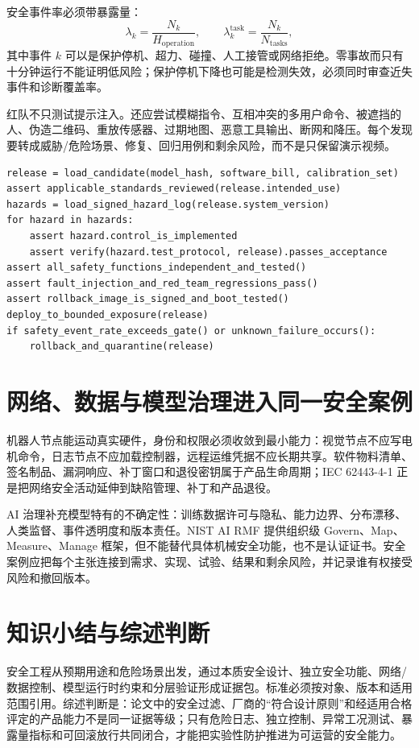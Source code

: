 安全事件率必须带暴露量：
\begin{equation}
\lambda_k=\frac{N_k}{H_{\mathrm{operation}}},
\qquad
\lambda_k^{\mathrm{task}}=\frac{N_k}{N_{\mathrm{tasks}}},
\label{eq:safety-exposure-rate}
\end{equation}
其中事件 $k$ 可以是保护停机、超力、碰撞、人工接管或网络拒绝。零事故而只有十分钟运行不能证明低风险；保护停机下降也可能是检测失效，必须同时审查近失事件和诊断覆盖率。

红队不只测试提示注入。还应尝试模糊指令、互相冲突的多用户命令、被遮挡的人、伪造二维码、重放传感器、过期地图、恶意工具输出、断网和降压。每个发现要转成威胁/危险场景、修复、回归用例和剩余风险，而不是只保留演示视频。

\begin{lstlisting}[caption={证据包驱动的安全放行教学伪代码}]
release = load_candidate(model_hash, software_bill, calibration_set)
assert applicable_standards_reviewed(release.intended_use)
hazards = load_signed_hazard_log(release.system_version)
for hazard in hazards:
    assert hazard.control_is_implemented
    assert verify(hazard.test_protocol, release).passes_acceptance
assert all_safety_functions_independent_and_tested()
assert fault_injection_and_red_team_regressions_pass()
assert rollback_image_is_signed_and_boot_tested()
deploy_to_bounded_exposure(release)
if safety_event_rate_exceeds_gate() or unknown_failure_occurs():
    rollback_and_quarantine(release)
\end{lstlisting}

\section{网络、数据与模型治理进入同一安全案例}

机器人节点能运动真实硬件，身份和权限必须收敛到最小能力：视觉节点不应写电机命令，日志节点不应加载控制器，远程运维凭据不应长期共享。软件物料清单、签名制品、漏洞响应、补丁窗口和退役密钥属于产品生命周期；IEC 62443-4-1 正是把网络安全活动延伸到缺陷管理、补丁和产品退役\cite{iec62443_4_1_2018}。

AI 治理补充模型特有的不确定性：训练数据许可与隐私、能力边界、分布漂移、人类监督、事件透明度和版本责任。NIST AI RMF 提供组织级 Govern、Map、Measure、Manage 框架\cite{nist2023airmf}，但不能替代具体机械安全功能，也不是认证证书。安全案例应把每个主张连接到需求、实现、试验、结果和剩余风险，并记录谁有权接受风险和撤回版本。

\section{知识小结与综述判断}

安全工程从预期用途和危险场景出发，通过本质安全设计、独立安全功能、网络/数据控制、模型运行时约束和分层验证形成证据包。标准必须按对象、版本和适用范围引用。综述判断是：论文中的安全过滤、厂商的“符合设计原则”和经适用合格评定的产品能力不是同一证据等级；只有危险日志、独立控制、异常工况测试、暴露量指标和可回滚放行共同闭合，才能把实验性防护推进为可运营的安全能力。
